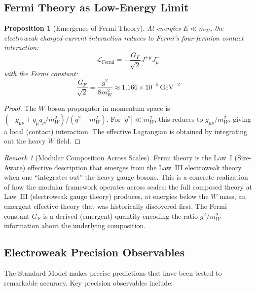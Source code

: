 \documentclass[12pt]{article}
\newtheorem{proposition}[theorem]{Proposition}
\theoremstyle{definition}
\theoremstyle{remark}
\newtheorem{remark}[theorem]{Remark}
\newcommand{\Lagr}{\mathcal{L}}
\newcommand{\GeV}{\,\mathrm{GeV}}
\begin{document}
\subsection{Fermi Theory as Low-Energy Limit}

\begin{proposition}[Emergence of Fermi Theory]
\label{prop:fermi}
At energies $E \ll m_W$, the electroweak charged-current interaction reduces to Fermi's four-fermion contact interaction:
\begin{equation}
\Lagr_{\mathrm{Fermi}} = -\frac{G_F}{\sqrt{2}} J^{+\mu} J^-_\mu
\end{equation}
with the Fermi constant:
\begin{equation}
\frac{G_F}{\sqrt{2}} = \frac{g^2}{8m_W^2} \approx 1.166 \times 10^{-5}\GeV^{-2}
\end{equation}
\end{proposition}

\begin{proof}
The $W$-boson propagator in momentum space is $(-g_{\mu\nu} + q_\mu q_\nu / m_W^2)/(q^2 - m_W^2)$. For $|q^2| \ll m_W^2$, this reduces to $g_{\mu\nu}/m_W^2$, giving a local (contact) interaction. The effective Lagrangian is obtained by integrating out the heavy $W$ field.
\end{proof}

\begin{remark}[Modular Composition Across Scales]
\label{rem:fermiemerge}
Fermi theory is the Law~I (Size-Aware) effective description that emerges from the Law~III electroweak theory when one ``integrates out'' the heavy gauge bosons. This is a concrete realization of how the modular framework operates across scales: the full composed theory at Law~III (electroweak gauge theory) produces, at energies below the $W$ mass, an emergent effective theory that was historically discovered first. The Fermi constant $G_F$ is a derived (emergent) quantity encoding the ratio $g^2/m_W^2$---information about the underlying composition.
\end{remark}

\subsection{Electroweak Precision Observables}

The Standard Model makes precise predictions that have been tested to remarkable accuracy. Key precision observables include:
\end{document}

